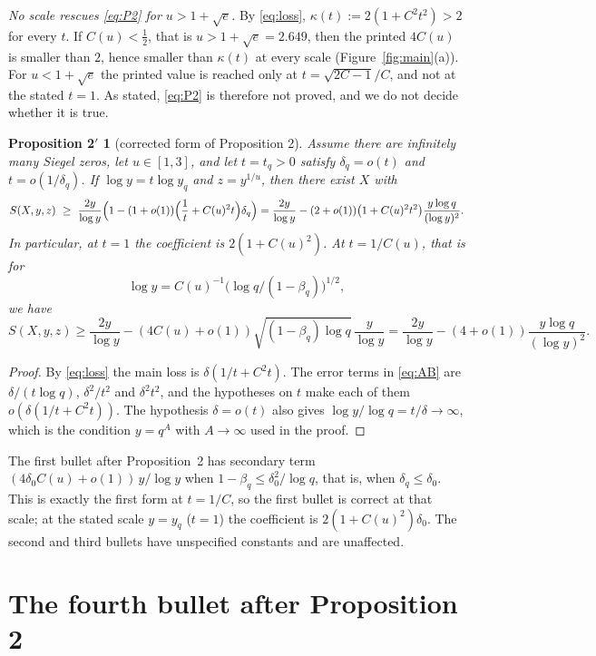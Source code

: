 \documentclass[11pt,a4paper]{amsart}
\newtheorem*{propc}{Proposition 2$'$}
\theoremstyle{remark}
\begin{document}
\emph{No scale rescues \eqref{eq:P2} for $u>1+\sqrt e$.} By \eqref{eq:loss}, $\kappa(t):=2(1+C^2t^2)>2$
for every $t$. If $C(u)<\frac12$, that is $u>1+\sqrt e=2.649$, then the printed $4C(u)$ is smaller than
$2$, hence smaller than $\kappa(t)$ at every scale (Figure~\ref{fig:main}(a)). For $u<1+\sqrt e$ the
printed value is reached only at $t=\sqrt{2C-1}/C$, and not at the stated $t=1$. As stated,
\eqref{eq:P2} is therefore not proved, and we do not decide whether it is true.

\begin{propc}[corrected form of Proposition 2]
Assume there are infinitely many Siegel zeros, let $u\in[1,3]$, and let $t=t_q>0$ satisfy
$\delta_q=o(t)$ and $t=o(1/\delta_q)$. If $\log y=t\log y_q$ and $z=y^{1/u}$, then there exist $X$ with
\[
S(X,y,z)\ \ge\ \frac{2y}{\log y}\Bigl(1-(1+o(1))\Bigl(\frac1t+C(u)^2t\Bigr)\delta_q\Bigr)
=\frac{2y}{\log y}-(2+o(1))\bigl(1+C(u)^2t^2\bigr)\frac{y\log q}{(\log y)^2}.
\]
In particular, at $t=1$ the coefficient is $2(1+C(u)^2)$. At $t=1/C(u)$, that is for
\[
\log y=C(u)^{-1}\bigl(\log q/(1-\beta_q)\bigr)^{1/2},
\]
we have
\[
S(X,y,z)\ge\frac{2y}{\log y}-(4C(u)+o(1))\sqrt{(1-\beta_q)\log q}\,\frac{y}{\log y}
=\frac{2y}{\log y}-(4+o(1))\frac{y\log q}{(\log y)^2}.
\]
\end{propc}

\begin{proof}
By \eqref{eq:loss} the main loss is $\delta(1/t+C^2t)$. The error terms in \eqref{eq:AB} are
$\delta/(t\log q)$, $\delta^2/t^2$ and $\delta^2t^2$, and the hypotheses on $t$ make each of them
$o(\delta(1/t+C^2t))$. The hypothesis $\delta=o(t)$ also gives $\log y/\log q=t/\delta\to\infty$, which is
the condition $y=q^A$ with $A\to\infty$ used in the proof.
\end{proof}

The first bullet after Proposition~2 has secondary term $(4\delta_0C(u)+o(1))\,y/\log y$ when
$1-\beta_q\le\delta_0^2/\log q$, that is, when $\delta_q\le\delta_0$. This is exactly the first form at
$t=1/C$, so the first bullet is correct at that scale; at the stated scale $y=y_q$ ($t=1$) the
coefficient is $2(1+C(u)^2)\delta_0$. The second and third bullets have unspecified
constants and are unaffected.

\section{The fourth bullet after Proposition 2}\label{sec:bullet4}
\end{document}
